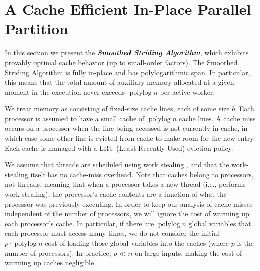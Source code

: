 \documentclass[twocolumn,10pt]{article}
\newcommand{\polylog}{\operatorname{polylog}}
\newcommand{\defn}[1]{{\textit{\textbf{\boldmath #1}}}\xspace}
\renewcommand{\paragraph}[1]{\vspace{0.09in}\noindent{\bf \boldmath #1.}}
\theoremstyle{remark}
\theoremstyle{remark}
\begin{document}
\section{A Cache Efficient In-Place Parallel Partition}\label{sec:smoothing}


In this section we present the \defn{Smoothed Striding Algorithm},
which exhibits provably optimal cache behavior (up to small-order
factors). The Smoothed Striding Algorithm is fully in-place and has
polylogarithmic span. In particular, this means that the total amount
of auxiliary memory allocated at a given moment in the execution never
exceeds $\polylog n$ per active worker.



\paragraph{Modeling Cache Misses}
We treat memory as consisting of fixed-size cache lines, each of some
size $b$. Each processor is assumed to have a small cache of
$\operatorname{polylog}{n}$ cache lines.  A cache miss occurs on a
processor when the line being accessed is not currently in cache, in
which case some other line is evicted from cache to make room for the
new entry.  Each cache is managed with a LRU (Least Recently Used)
eviction policy.

We assume that threads are scheduled using work stealing \cite{AcarBl00},
and that the work-stealing itself has no cache-miss overhead. Note
that caches belong to processors, not threads, meaning that when a
processor takes a new thread (i.e., performs work stealing), the
processor's cache contents are a function of what the processor was
previously executing. In order to keep our analysis of cache misses
independent of the number of processors, we will ignore the cost of
warming up each processor's cache. In particular, if there are
$\polylog n$ global variables that each processor must access many
times, we do not consider the initial $p \cdot \polylog n$ cost of
loading those global variables into the caches (where $p$ is the
number of processors). In practice, $p \ll n$ on large inputs, making
the cost of warming up caches negligible.
\end{document}
